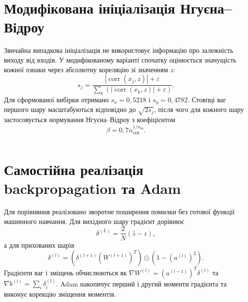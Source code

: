 \documentclass[12pt,a4paper]{article}
\newcommand{\srcDir}{../src}
\begin{document}
\begin{listing}[H]
\inputminted[firstline=184,lastline=230]{python}{\srcDir/mkr_core.py}
\caption{Оцінювання, відбір, кросовер і мутація}
\end{listing}

\section{Модифікована ініціалізація Нгуєна--Відроу}
Звичайна випадкова ініціалізація не використовує інформацію про залежність виходу від входів. У модифікованому варіанті спочатку оцінюється значущість кожної ознаки через абсолютну кореляцію зі значенням $z$:
\begin{equation}
s_j=\frac{|\operatorname{corr}(x_j,z)|+\varepsilon}
{\sum_k(|\operatorname{corr}(x_k,z)|+\varepsilon)}.
\end{equation}
Для сформованої вибірки отримано $s_x=0{,}5218$ і $s_y=0{,}4782$. Стовпці ваг першого шару масштабуються відповідно до $\sqrt{2s_j}$, після чого для кожного шару застосовується нормування Нгуєна--Відроу з коефіцієнтом
\begin{equation}
\beta=0{,}7n_{\mathrm{out}}^{1/n_{\mathrm{in}}}.
\end{equation}

\begin{listing}[H]
\inputminted[firstline=114,lastline=144]{python}{\srcDir/mkr_core.py}
\caption{Оцінювання значущості ознак та модифікована ініціалізація}
\end{listing}

\section{Самостійна реалізація backpropagation та Adam}
Для порівняння реалізовано зворотне поширення помилки без готової функції машинного навчання. Для вихідного шару градієнт дорівнює
\begin{equation}
\delta^{(L)}=\frac{2}{N}(\hat z-z),
\end{equation}
а для прихованих шарів
\begin{equation}
\delta^{(l)}=\left(\delta^{(l+1)}(W^{(l+1)})^T\right)\odot\left(1-(a^{(l)})^2\right).
\end{equation}
Градієнти ваг і зміщень обчислюються як $\nabla W^{(l)}=(a^{(l-1)})^T\delta^{(l)}$ та $\nabla b^{(l)}=\sum_i\delta_i^{(l)}$. Adam накопичує перший і другий моменти градієнта та виконує корекцію зміщення моментів.

\begin{listing}[H]
\inputminted[firstline=267,lastline=296]{python}{\srcDir/mkr_core.py}
\caption{Власна реалізація backpropagation та Adam}
\end{listing}
\end{document}
